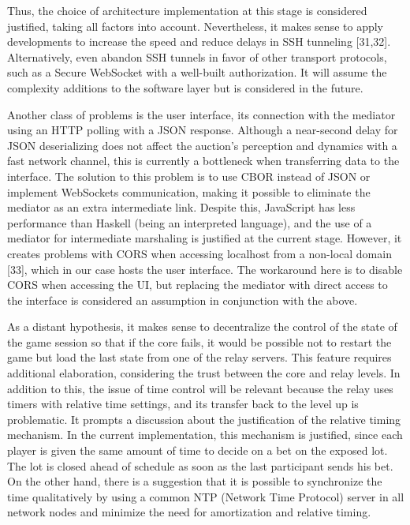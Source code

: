 \documentclass[
]{ceurart}
\begin{document}
Thus, the choice of architecture implementation at this stage is considered justified, taking all factors into account. Nevertheless, it makes sense to apply developments to increase the speed and reduce delays in SSH tunneling [31,32]. Alternatively, even abandon SSH tunnels in favor of other transport protocols, such as a Secure WebSocket with a well-built authorization. It will assume the complexity additions to the software layer but is considered in the future.

Another class of problems is the user interface, its connection with the mediator using an HTTP polling with a JSON response. Although a near-second delay for JSON deserializing does not affect the auction’s perception and dynamics with a fast network channel, this is currently a bottleneck when transferring data to the interface. The solution to this problem is to use CBOR instead of JSON or implement WebSockets communication, making it possible to eliminate the mediator as an extra intermediate link. Despite this, JavaScript has less performance than Haskell (being an interpreted language), and the use of a mediator for intermediate marshaling is justified at the current stage. However, it creates problems with CORS when accessing localhost from a non-local domain [33], which in our case hosts the user interface. The workaround here is to disable CORS when accessing the UI, but replacing the mediator with direct access to the interface is considered an assumption in conjunction with the above.

As a distant hypothesis, it makes sense to ​​decentralize the control of the state of the game session so that if the core fails, it would be possible not to restart the game but load the last state from one of the relay servers. This feature requires additional elaboration, considering the trust between the core and relay levels. In addition to this, the issue of time control will be relevant because the relay uses timers with relative time settings, and its transfer back to the level up is problematic. It prompts a discussion about the justification of the relative timing mechanism. In the current implementation, this mechanism is justified, since each player is given the same amount of time to decide on a bet on the exposed lot. The lot is closed ahead of schedule as soon as the last participant sends his bet. On the other hand, there is a suggestion that it is possible to synchronize the time qualitatively by using a common NTP (Network Time Protocol) server in all network nodes and minimize the need for amortization and relative timing.
\end{document}
